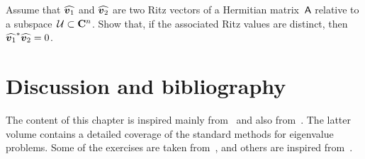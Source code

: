 \begin{exercise}
    Assume that $\widehat{\mathbf{\boldsymbol{v}}_1}$ and $\widehat{\mathbf{\boldsymbol{v}}_2}$ are two Ritz vectors of a Hermitian matrix~$\mathsf A$ relative to a subspace~$\mathcal U \subset \mathbf C^n$.
    Show that, if the associated Ritz values are distinct,
    then $\widehat{\mathbf{\boldsymbol{v}}_1}^* \widehat{\mathbf{\boldsymbol{v}}_2} = 0$.
\end{exercise}

\section{Discussion and bibliography}

The content of this chapter is inspired mainly from~\cite{VanDooren} and also from~\cite{MR3396212}.
The latter volume contains a detailed coverage of the standard methods for eigenvalue problems.
Some of the exercises are taken from~\cite{Vuik},
and others are inspired from~\cite{MR3396212}.
